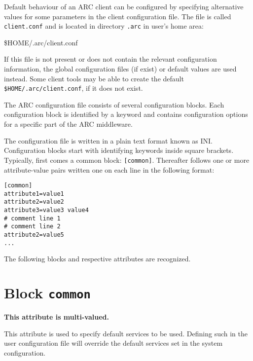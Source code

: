 Default behaviour of an ARC client can be configured by specifying
alternative values for some parameters in the client configuration
file. The file is called \texttt{client.conf} and is located in
directory \texttt{.arc} in user's home area:
\begin{shaded}
 {\$}HOME/.arc/client.conf
\end{shaded}
If this file is not present or does not contain the relevant
configuration information, the global configuration files (if exist)
or default values are used instead. Some client tools may be able to create
the default \texttt{{\$}HOME/.arc/client.conf}, if it does not exist.

The ARC configuration file consists of several configuration blocks.
Each configuration block is identified by a keyword and contains
configuration options for a specific part of the ARC middleware. 

The configuration file is written in a plain text format known as INI.
Configuration blocks start with identifying keywords inside square brackets.
Typically, first comes a common block: \verb#[common]#. Thereafter follows one
or more attribute-value pairs written one on each line in the following
format:

\begin{framed}
\begin{verbatim}
[common]
attribute1=value1
attribute2=value2
attribute3=value3 value4
# comment line 1
# comment line 2
attribute2=value5
...
\end{verbatim}
\end{framed}


The following blocks and respective attributes are recognized.

\section{Block \texttt{common}}

{}
\hspace*{0.5cm}
\begin{shaded}
\end{shaded}
\textbf{This attribute is multi-valued.}

This attribute is used to specify default services to be used. Defining such in
the user configuration file will override the default services set in the system
configuration.

